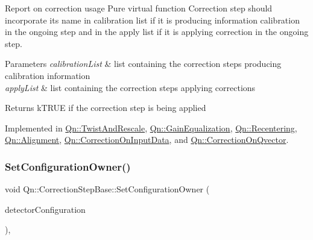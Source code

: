Report on correction usage Pure virtual function Correction step should incorporate its name in calibration list if it is producing information calibration in the ongoing step and in the apply list if it is applying correction in the ongoing step. 
\begin{DoxyParams}{Parameters}
{\em calibration\+List} & list containing the correction steps producing calibration information \\
\hline
{\em apply\+List} & list containing the correction steps applying corrections \\
\hline
\end{DoxyParams}
\begin{DoxyReturn}{Returns}
k\+T\+R\+UE if the correction step is being applied 
\end{DoxyReturn}


Implemented in \mbox{\hyperlink{classQn_1_1TwistAndRescale_a2a6c985100656523b3d834a31d8f19a8}{Qn\+::\+Twist\+And\+Rescale}}, \mbox{\hyperlink{classQn_1_1GainEqualization_af444038af10eb53d8bd6c8703d4e5629}{Qn\+::\+Gain\+Equalization}}, \mbox{\hyperlink{classQn_1_1Recentering_a06240f91a7656df95ac5aa55773b056a}{Qn\+::\+Recentering}}, \mbox{\hyperlink{classQn_1_1Alignment_af8ef33833778e9af4bdb7b82f679c941}{Qn\+::\+Alignment}}, \mbox{\hyperlink{classQn_1_1CorrectionOnInputData_a40b05b6db47e8dd52e1f6a616b9b9d3a}{Qn\+::\+Correction\+On\+Input\+Data}}, and \mbox{\hyperlink{classQn_1_1CorrectionOnQvector_a322860c299f0ca1db46ddd57c0828ba1}{Qn\+::\+Correction\+On\+Qvector}}.

\mbox{\label{classQn_1_1CorrectionStepBase_a9beb30d4220e357047706383b0a490fb}} 
\subsubsection{\texorpdfstring{Set\+Configuration\+Owner()}{SetConfigurationOwner()}}
{\footnotesize\ttfamily void Qn\+::\+Correction\+Step\+Base\+::\+Set\+Configuration\+Owner (\begin{DoxyParamCaption}\item[{\mbox{\hyperlink{classQn_1_1DetectorConfiguration}{Detector\+Configuration}} $\ast$}]{detector\+Configuration }\end{DoxyParamCaption})\hspace{0.3cm}{\ttfamily [inline]}, {\ttfamily [protected]}}

